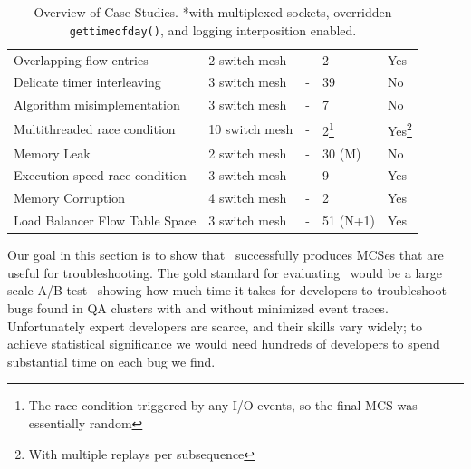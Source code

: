 \begin{table}
\begin{tabular}{l|l|l|l|l|}
Overlapping flow entries & 2 switch mesh & - & 2 & Yes \\
Delicate timer interleaving & 3 switch mesh & - & 39 & No \\
Algorithm misimplementation & 3 switch mesh & - & 7 & No \\
Multithreaded race condition & 10 switch mesh & - & 2\footnote{The race
condition triggered by any I/O events, so the final MCS was essentially
random} & Yes\footnote{With multiple replays per subsequence} \\
Memory Leak & 2 switch mesh & - & 30 (M) & No \\
Execution-speed race condition & 3 switch mesh & - & 9 & Yes \\
Memory Corruption & 4 switch mesh & - & 2 & Yes \\
Load Balancer Flow Table Space & 3 switch mesh & - & 51 (N+1) & Yes \\
\end{tabular}
\caption{Overview of Case Studies. \newline
\textmd{*with multiplexed sockets, overridden {\tt gettimeofday()}, and
logging interposition enabled.}}
\label{tab:case_studies}
\end{table}

Our goal in this section is to show that \projectname~successfully produces
MCSes that are useful for troubleshooting. The
gold standard for evaluating \projectname~would be a large scale A/B test~\cite{neyman}
showing how much time it takes for developers to troubleshoot bugs found in
QA clusters with and without minimized event traces. Unfortunately
expert developers are scarce, and their skills vary widely; to achieve statistical significance we would
need hundreds of developers to spend substantial time on each bug we find.

